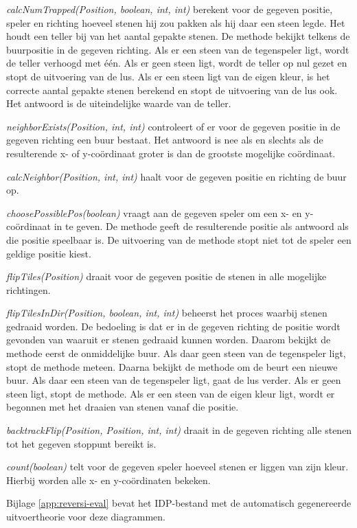 \textit{calcNumTrapped(Position, boolean, int, int)} berekent voor de gegeven positie, speler en richting hoeveel stenen hij zou pakken als hij daar een steen legde. Het houdt een teller bij van het aantal gepakte stenen. De methode bekijkt telkens de buurpositie in de gegeven richting. Als er een steen van de tegenspeler ligt, wordt de teller verhoogd met \'e\'en. Als er geen steen ligt, wordt de teller op nul gezet en stopt de uitvoering van de lus. Als er een steen ligt van de eigen kleur, is het correcte aantal gepakte stenen berekend en stopt de uitvoering van de lus ook. Het antwoord is de uiteindelijke waarde van de teller.

\textit{neighborExists(Position, int, int)} controleert of er voor de gegeven positie in de gegeven richting een buur bestaat. Het antwoord is nee als en slechts als de resulterende x- of y-co\"ordinaat groter is dan de grootste mogelijke co\"ordinaat.

\textit{calcNeighbor(Position, int, int)} haalt voor de gegeven positie en richting de buur op.

\textit{choosePossiblePos(boolean)} vraagt aan de gegeven speler om een x- en y-co\"ordinaat in te geven. De methode geeft de resulterende positie als antwoord als die positie speelbaar is. De uitvoering van de methode stopt niet tot de speler een geldige positie kiest.

\textit{flipTiles(Position)} draait voor de gegeven positie de stenen in alle mogelijke richtingen.

\textit{flipTilesInDir(Position, boolean, int, int)} beheerst het proces waarbij stenen gedraaid worden. De bedoeling is dat er in de gegeven richting de positie wordt gevonden van waaruit er stenen gedraaid kunnen worden. Daarom bekijkt de methode eerst de onmiddelijke buur. Als daar geen steen van de tegenspeler ligt, stopt de methode meteen. Daarna bekijkt de methode om de beurt een nieuwe buur. Als daar een steen van de tegenspeler ligt, gaat de lus verder. Als er geen steen ligt, stopt de methode. Als er een steen van de eigen kleur ligt, wordt er begonnen met het draaien van stenen vanaf die positie.

\textit{backtrackFlip(Position, Position, int, int)} draait in de gegeven richting alle stenen tot het gegeven stoppunt bereikt is.

\textit{count(boolean)} telt voor de gegeven speler hoeveel stenen er liggen van zijn kleur. Hierbij worden alle x- en y-co\"ordinaten bekeken.

Bijlage \ref{app:reversi-eval} bevat het IDP-bestand met de automatisch gegenereerde uitvoertheorie voor deze diagrammen.

